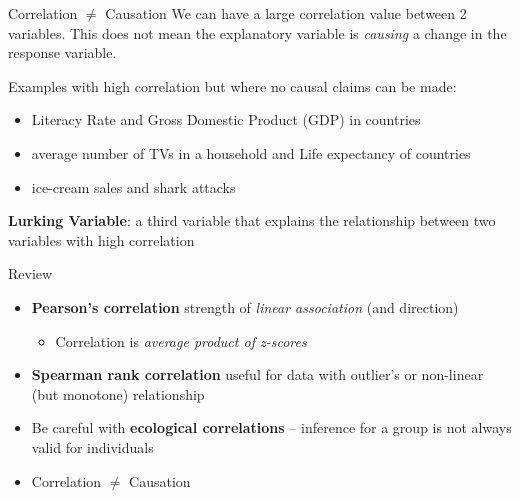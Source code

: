 \documentclass{beamer}
\begin{document}
\begin{frame}{Correlation $\neq$ Causation}
    We can have a large correlation value between 2 variables. This does not mean the explanatory variable is \textit{causing} a change in the response variable. \vspace{4mm}

Examples with high correlation but where no causal claims can be made:
\begin{itemize}
    \item Literacy Rate and Gross Domestic Product (GDP) in countries
    \item average number of TVs in a household and Life expectancy of countries
    \item ice-cream sales and shark attacks
\end{itemize} \vspace{6mm}

\textbf{Lurking Variable}: a third variable that explains the relationship between two variables with high correlation
\end{frame}



\begin{frame}{Review}

\begin{itemize}
\item \textbf{Pearson's correlation} strength of \textit{linear association} (and direction)
\begin{itemize}
\item Correlation is \textit{average product of z-scores}
\end{itemize}
\item \textbf{Spearman  rank correlation} useful for data with outlier's or non-linear (but monotone) relationship
\item Be careful with \textbf{ecological correlations} -- inference for a group is not always valid for individuals
\item Correlation $\neq$ Causation
\end{itemize}


\end{frame}




%
%
%
%
%





%
%
\end{document}
